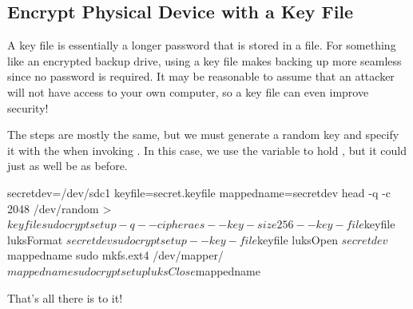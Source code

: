 \subsection{Encrypt Physical Device with a Key File}

A key file is essentially a longer password that is stored in a file.
For something like an encrypted backup drive, using a key file makes backing up more seamless since no password is required.
It may be reasonable to assume that an attacker will not have access to your own computer, so a key file can even improve security!

The steps are mostly the same, but we must generate a random key and specify it with the  when invoking .
In this case, we use the variable  to hold , but it could just as well be  as before.

\begin{code}
secretdev=/dev/sdc1
keyfile=secret.keyfile
mappedname=secretdev
head -q -c 2048 /dev/random > $keyfile
sudo cryptsetup -q --cipher aes --key-size 256 --key-file $keyfile luksFormat $secretdev
sudo cryptsetup --key-file $keyfile luksOpen $secretdev $mappedname
sudo mkfs.ext4 /dev/mapper/$mappedname
sudo cryptsetup luksClose $mappedname
\end{code}

That's all there is to it!





